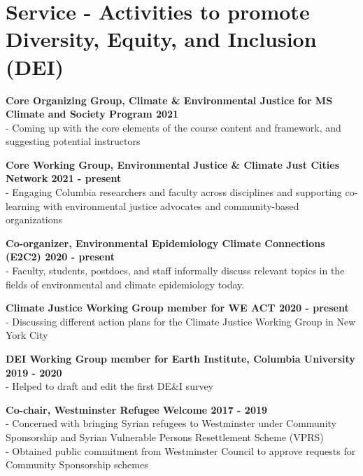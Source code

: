 \section*{Service - Activities to promote Diversity, Equity, and Inclusion (DEI)}

\noindent \textbf{Core Organizing Group, Climate \& Environmental Justice for MS Climate and Society Program \hfill 2021}\\
- Coming up with the core elements of the course content and framework, and suggesting potential instructors \medskip

\noindent \textbf{Core Working Group, Environmental Justice \& Climate Just Cities Network \hfill 2021 - present}\\
- Engaging Columbia researchers and faculty across disciplines and supporting co-learning with environmental justice advocates and community-based organizations \medskip

\noindent \textbf{Co-organizer, Environmental Epidemiology Climate Connections (E2C2) \hfill 2020 - present}\\
- Faculty, students, postdocs, and staff informally discuss relevant topics in the fields of environmental and climate epidemiology today. \medskip

\noindent \textbf{Climate Justice Working Group member for WE ACT \hfill 2020 - present}\\
- Discussing different action plans for the Climate Justice Working Group in New York City \medskip

\noindent \textbf{DEI Working Group member for Earth Institute, Columbia University \hfill 2019 - 2020}\\
- Helped to draft and edit the first DE\&I survey \medskip



\noindent \textbf{Co-chair, Westminster Refugee Welcome \hfill 2017 - 2019}\\
- Concerned with bringing Syrian refugees to Westminster under Community Sponsorship and Syrian Vulnerable Persons Resettlement Scheme (VPRS)\\
- Obtained public commitment from Westminster Council to approve requests for Community Sponsorship schemes	 \medskip


